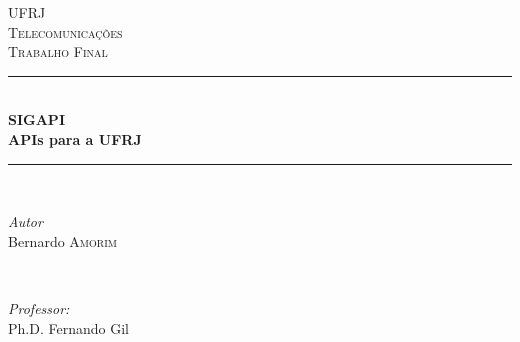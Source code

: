 \begin{titlepage}

\newcommand{\HRule}{\rule{\linewidth}{0.5mm}} %

\center %
 

\textsc{\LARGE UFRJ}\\[1.5cm] %
\textsc{\Large Telecomunicações}\\[0.5cm] %
\textsc{\large Trabalho Final}\\[0.5cm] %


\HRule \\[0.4cm]
{ \huge \bfseries SIGAPI\\
APIs para a UFRJ}\\[0.4cm] %
\HRule \\[1.5cm]
 

\begin{minipage}{0.4\textwidth}
\begin{center} \large
\emph{Autor}\\
Bernardo \textsc{Amorim} %
\end{center}
\end{minipage}
~
\begin{minipage}{0.4\textwidth}
\begin{flushright} \large
\emph{Professor:} \\
Ph.D. Fernando Gil %
\end{flushright}
\end{minipage}\\[2cm]



\end{titlepage}
